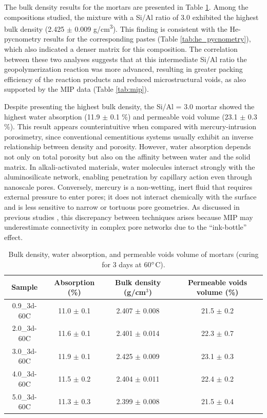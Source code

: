 The bulk density results for the mortars are presented in Table \ref{tab:bulk_density_water_absorption}.
Among the compositions studied, the mixture with a Si/Al ratio of 3.0 exhibited the highest bulk density (2.425 $\pm$ 0.009 g/cm\textsuperscript{3}).
This finding is consistent with the He-pycnometry results for the corresponding pastes (Table \ref{tab:he_pycnometry}), which also indicated a denser matrix for this composition.
The correlation between these two analyses suggests that at this intermediate Si/Al ratio the geopolymerization reaction was more advanced, resulting in greater packing efficiency of the reaction products and reduced microstructural voids, as also supported by the MIP data (Table \ref{tab:mip}).

Despite presenting the highest bulk density, the Si/Al = 3.0 mortar showed the highest water absorption (11.9 $\pm$ 0.1 \%) and permeable void volume (23.1 $\pm$ 0.3 \%).
This result appears counterintuitive when compared with mercury-intrusion porosimetry, since conventional cementitious systems usually exhibit an inverse relationship between density and porosity.
However, water absorption depends not only on total porosity but also on the affinity between water and the solid matrix.
In alkali-activated materials, water molecules interact strongly with the aluminosilicate network, enabling penetration by capillary action even through nanoscale pores.
Conversely, mercury is a non-wetting, inert fluid that requires external pressure to enter pores; it does not interact chemically with the surface and is less sensitive to narrow or tortuous pore geometries.
As discussed in previous studies \cite{Provis2014_LowCa}, this discrepancy between techniques arises because MIP may underestimate connectivity in complex pore networks due to the “ink-bottle” effect.

\begin{table}[H]
  \centering
  \caption{Bulk density, water absorption, and permeable voids volume of mortars (curing for 3 days at 60$^{\circ}$C).}
  \label{tab:bulk_density_water_absorption}
  \begin{tabular}{cccc}
    \hline
    Sample & Absorption (\%) & Bulk density (g/cm$^3$) & Permeable voids volume (\%) \\
    \hline
    0.9\_3d-60C & 11.0 $\pm$ 0.1 & 2.407 $\pm$ 0.008 & 21.5 $\pm$ 0.2 \\
    2.0\_3d-60C & 11.6 $\pm$ 0.1 & 2.401 $\pm$ 0.014 & 22.3 $\pm$ 0.7 \\
    3.0\_3d-60C & 11.9 $\pm$ 0.1 & 2.425 $\pm$ 0.009 & 23.1 $\pm$ 0.3 \\
    4.0\_3d-60C & 11.5 $\pm$ 0.2 & 2.404 $\pm$ 0.011 & 22.4 $\pm$ 0.2 \\
    5.0\_3d-60C & 11.3 $\pm$ 0.3 & 2.399 $\pm$ 0.008 & 21.5 $\pm$ 0.4 \\
    \hline
  \end{tabular}
\end{table}

